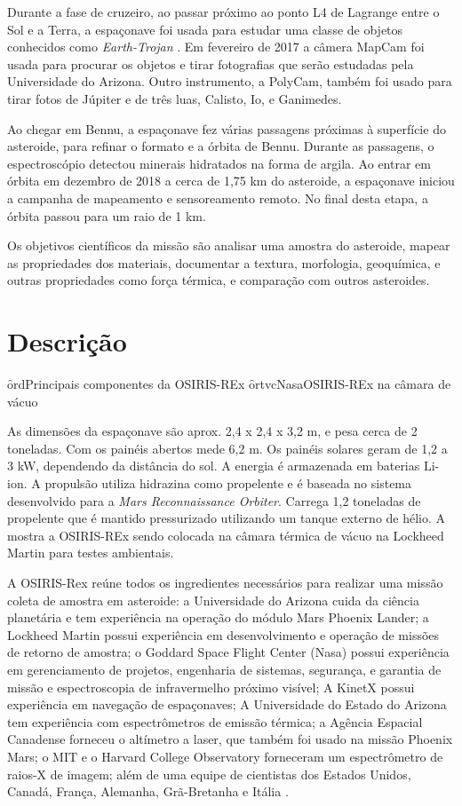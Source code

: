 Durante a fase de cruzeiro, ao passar próximo ao ponto L4 de Lagrange entre o Sol e a Terra, a espaçonave foi usada para estudar uma classe de objetos conhecidos como \textit{Earth-Trojan} \cite{ETrojan}. Em fevereiro de 2017 a câmera MapCam foi usada para procurar os objetos e tirar fotografias que serão estudadas pela Universidade do Arizona. Outro instrumento, a PolyCam, também foi usado para tirar fotos de Júpiter e de três luas, Calisto, Io, e Ganimedes.

Ao chegar em Bennu, a espaçonave fez várias passagens próximas à superfície do asteroide, para refinar o formato e a órbita de Bennu. Durante as passagens, o espectroscópio detectou minerais hidratados na forma de argila. Ao entrar em órbita em dezembro de 2018 a cerca de 1,75 km do asteroide, a espaçonave iniciou a campanha de mapeamento e sensoreamento remoto. No final desta etapa, a órbita passou para um raio de 1 km.

Os objetivos científicos da missão são analisar uma amostra do asteroide, mapear as propriedades dos materiais, documentar a textura, morfologia, geoquímica, e outras propriedades como força térmica, e comparação com outros asteroides.

\section{Descrição} %

\f{ord}{}{Principais componentes da OSIRIS-REx}
\f{ortvc}{Nasa}{OSIRIS-REx na câmara de vácuo}

As dimensões da espaçonave são aprox. 2,4 x 2,4 x 3,2 m, e pesa cerca de 2 toneladas. Com os painéis abertos mede 6,2 m. Os painéis solares geram de 1,2 a 3 kW, dependendo da distância do sol. A energia é armazenada em baterias Li-ion. A propulsão utiliza hidrazina como propelente e é baseada no sistema desenvolvido para a \textit{Mars Reconnaissance Orbiter}. Carrega 1,2 toneladas de propelente que é mantido pressurizado utilizando um tanque externo de hélio. A  mostra a OSIRIS-REx sendo colocada na câmara térmica de vácuo na Lockheed Martin para testes ambientais. 

A OSIRIS-Rex reúne todos os ingredientes necessários para realizar uma missão coleta de amostra em asteroide: a Universidade do Arizona cuida da ciência planetária e tem experiência na operação do módulo Mars Phoenix Lander; a Lockheed Martin possui experiência em desenvolvimento e operação de missões de retorno de amostra; o Goddard Space Flight Center (Nasa) possui experiência em gerenciamento de projetos, engenharia de sistemas, segurança, e garantia de missão e espectroscopia de infravermelho próximo visível; A KinetX possui experiência em navegação de espaçonaves; A Universidade do Estado do Arizona tem experiência com espectrômetros de emissão térmica; a Agência Espacial Canadense forneceu o altímetro a laser, que também foi usado na missão Phoenix Mars; o MIT e o Harvard College Observatory forneceram um espectrômetro de raios-X de imagem; além de uma equipe de cientistas dos Estados Unidos, Canadá, França, Alemanha, Grã-Bretanha e Itália
\cite{osiris2020}.

